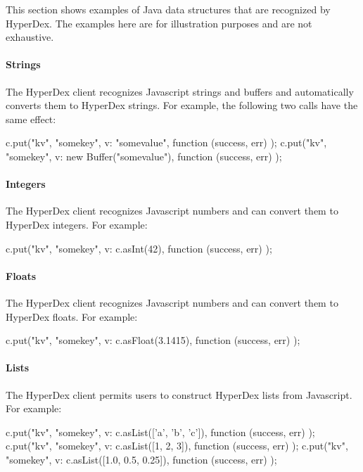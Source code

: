 This section shows examples of Java data structures that are recognized by
HyperDex.  The examples here are for illustration purposes and are not
exhaustive.

\paragraph{Strings}

The HyperDex client recognizes Javascript strings and buffers and automatically
converts them to HyperDex strings.  For example, the following two calls have
the same effect:

\begin{javascriptcode}
c.put("kv", "somekey", {v: "somevalue"}, function (success, err) {});
c.put("kv", "somekey", {v: new Buffer("somevalue")}, function (success, err) {});
\end{javascriptcode}

\paragraph{Integers}

The HyperDex client recognizes Javascript numbers and can convert them to
HyperDex integers.  For example:

\begin{javascriptcode}
c.put("kv", "somekey", {v: c.asInt(42)}, function (success, err) {});
\end{javascriptcode}

\paragraph{Floats}

The HyperDex client recognizes Javascript numbers and can convert them to
HyperDex floats.  For example:

\begin{javascriptcode}
c.put("kv", "somekey", {v: c.asFloat(3.1415)}, function (success, err) {});
\end{javascriptcode}

\paragraph{Lists}

The HyperDex client permits users to construct HyperDex lists from Javascript.
For example:

\begin{javascriptcode}
c.put("kv", "somekey", {v: c.asList(['a', 'b', 'c'])}, function (success, err) {});
c.put("kv", "somekey", {v: c.asList([1, 2, 3])}, function (success, err) {});
c.put("kv", "somekey", {v: c.asList([1.0, 0.5, 0.25])}, function (success, err) {});
\end{javascriptcode}

